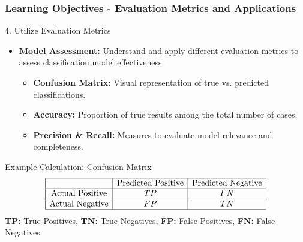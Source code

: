 \documentclass[aspectratio=169]{beamer}
\begin{document}
\begin{frame}[fragile]
    \frametitle{Learning Objectives - Evaluation Metrics and Applications}
    \begin{block}{4. Utilize Evaluation Metrics}
        \begin{itemize}
            \item \textbf{Model Assessment:} Understand and apply different evaluation metrics to assess classification model effectiveness:
            \begin{itemize}
                \item \textbf{Confusion Matrix:} Visual representation of true vs. predicted classifications.
                \item \textbf{Accuracy:} Proportion of true results among the total number of cases.
                \item \textbf{Precision \& Recall:} Measures to evaluate model relevance and completeness. 
            \end{itemize}
        \end{itemize}
    \end{block}

    \begin{block}{Example Calculation: Confusion Matrix}
        \[
        \begin{array}{|c|c|c|}
        \hline
        & \text{Predicted Positive} & \text{Predicted Negative} \\
        \hline
        \text{Actual Positive} & TP & FN \\
        \hline
        \text{Actual Negative} & FP & TN \\
        \hline
        \end{array}
        \]
        \textbf{TP:} True Positives, \textbf{TN:} True Negatives, \textbf{FP:} False Positives, \textbf{FN:} False Negatives.
    \end{block}
\end{frame}
\end{document}
